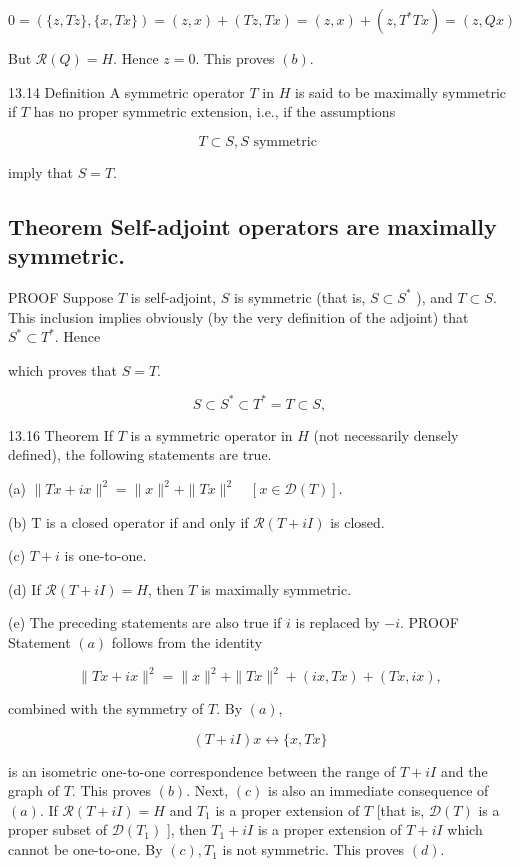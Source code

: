 \documentclass[10pt]{article}
\begin{document}
$$
0=(\{z, T z\},\{x, T x\})=(z, x)+(T z, T x)=(z, x)+\left(z, T^{*} T x\right)=(z, Q x)
$$

But $\mathscr{R}(Q)=H$. Hence $z=0$. This proves $(b)$.

13.14 Definition A symmetric operator $T$ in $H$ is said to be maximally symmetric if $T$ has no proper symmetric extension, i.e., if the assumptions

$$
T \subset S, S \text { symmetric }
$$

imply that $S=T$.

\subsection{Theorem Self-adjoint operators are maximally symmetric.}
PROOF Suppose $T$ is self-adjoint, $S$ is symmetric (that is, $S \subset S^{*}$ ), and $T \subset S$. This inclusion implies obviously (by the very definition of the adjoint) that $S^{*} \subset T^{*}$. Hence

which proves that $S=T$.

$$
S \subset S^{*} \subset T^{*}=T \subset S,
$$

13.16 Theorem If $T$ is a symmetric operator in $H$ (not necessarily densely defined), the following statements are true.

(a) $\|T x+i x\|^{2}=\|x\|^{2}+\|T x\|^{2} \quad[x \in \mathscr{D}(T)]$.

(b) T is a closed operator if and only if $\mathscr{R}(T+i I)$ is closed.

(c) $T+i$ is one-to-one.

(d) If $\mathscr{R}(T+i I)=H$, then $T$ is maximally symmetric.

(e) The preceding statements are also true if $i$ is replaced by $-i$. PROOF Statement $(a)$ follows from the identity

$$
\|T x+i x\|^{2}=\|x\|^{2}+\|T x\|^{2}+(i x, T x)+(T x, i x),
$$

combined with the symmetry of $T$. By $(a)$,

$$
(T+i I) x \leftrightarrow\{x, T x\}
$$

is an isometric one-to-one correspondence between the range of $T+i I$ and the graph of $T$. This proves $(b)$. Next, $(c)$ is also an immediate consequence of $(a)$. If $\mathscr{R}(T+i I)=H$ and $T_{1}$ is a proper extension of $T$ [that is, $\mathscr{D}(T)$ is a proper subset of $\mathscr{D}\left(T_{1}\right)$ ], then $T_{1}+i I$ is a proper extension of $T+i I$ which cannot be one-to-one. By $(c), T_{1}$ is not symmetric. This proves $(d)$.
\end{document}

